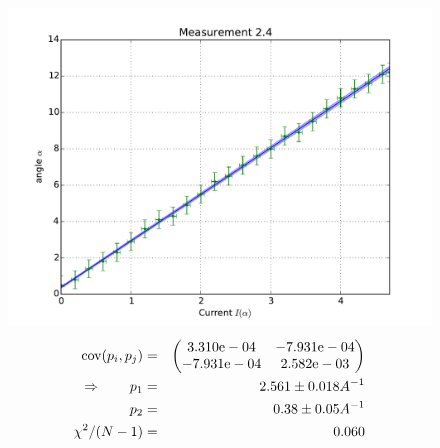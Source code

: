 \begin{figure}
    \begin{centering}
        \includegraphics[width=18cm]{figures/fig24}
\captionsetup{singlelinecheck=off} 
\caption[.]{
\begin{eqnarray*}
    \mathrm{cov}(p_i, p_j) &=& 
    \begin{pmatrix}
        3.310\mathrm{e}-04 &-7.931\mathrm{e}-04 \\
        -7.931\mathrm{e}-04 &2.582\mathrm{e}-03 \\
    \end{pmatrix}
\\ \Rightarrow \qquad
    p_1 &=& 2.561 \pm 0.018 A^{-1}\\
    p_2 &=& 0.38 \pm 0.05 A^{-1} \\
    \chi ^2/(N-1) &=&  0.060
\end{eqnarray*}
}
    \end{centering}
\end{figure}


